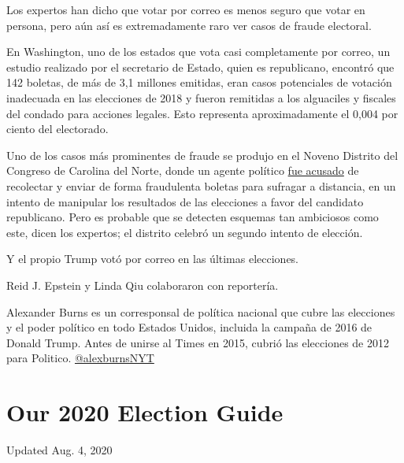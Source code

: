 Los expertos han dicho que votar por correo es menos seguro que votar en
persona, pero aún así es extremadamente raro ver casos de fraude
electoral.

En Washington, uno de los estados que vota casi completamente por
correo, un estudio realizado por el secretario de Estado, quien es
republicano, encontró que 142 boletas, de más de 3,1 millones emitidas,
eran casos potenciales de votación inadecuada en las elecciones de 2018
y fueron remitidas a los alguaciles y fiscales del condado para acciones
legales. Esto representa aproximadamente el 0,004 por ciento del
electorado.

Uno de los casos más prominentes de fraude se produjo en el Noveno
Distrito del Congreso de Carolina del Norte, donde un agente político
\href{https://www.nytimes3xbfgragh.onion/2019/07/30/us/mccrae-dowless-indictment.html}{fue
acusado} de recolectar y enviar de forma fraudulenta boletas para
sufragar a distancia, en un intento de manipular los resultados de las
elecciones a favor del candidato republicano. Pero es probable que se
detecten esquemas tan ambiciosos como este, dicen los expertos; el
distrito celebró un segundo intento de elección.

Y el propio Trump votó por correo en las últimas elecciones.

Reid J. Epstein y Linda Qiu colaboraron con reportería.

Alexander Burns es un corresponsal de política nacional que cubre las
elecciones y el poder político en todo Estados Unidos, incluida la
campaña de 2016 de Donald Trump. Antes de unirse al Times en 2015,
cubrió las elecciones de 2012 para Politico.
\href{https://twitter.com/alexburnsNYT}{@alexburnsNYT}

\hypertarget{our-2020-election-guide}{%
\section{Our 2020 Election Guide}\label{our-2020-election-guide}}

Updated Aug. 4, 2020

